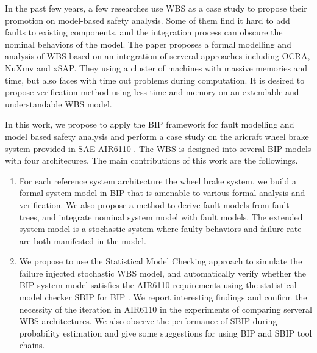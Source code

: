 

In the past few years, a few researches use WBS as a case study to propose their promotion on model-based safety analysis.
 Some of them find it hard to add faults to existing components, and the integration process can obscure the nominal behaviors of the model. 
 The paper\cite{cav15} proposes a formal modelling and analysis of WBS based on an integration of serveral approaches including OCRA, NuXmv and xSAP.
 They using a cluster of machines with massive memories and time, but also faces with time out problems during computation. 
 It is desired to propose verification method using less time and memory on an extendable and understandable WBS model.


In this work, we propose to apply the BIP framework for fault modelling and model based safety analysis 
 and perform a case study on the aricraft wheel brake system provided in SAE AIR6110  \cite{air6110}.
 The WBS is designed into several BIP models with four architecures. 
 The main contributions of this work are the followings.

\begin{enumerate}
\item For each reference system architecture the wheel brake system,  we build a formal system model in BIP that is amenable to various formal analysis and verification.
 We also propose a method to derive fault models from fault trees, and integrate nominal system model with fault models. 
 The extended system model is a stochastic system where faulty behaviors and failure rate are both manifested in the model.

\item We propose to use the Statistical Model Checking\cite{vmcai04,cav04,cmu04} approach to simulate the failure injected stochastic WBS model,
 and automatically verify whether the BIP system model satisfies the AIR6110 requirements using the statistical model checker SBIP for BIP \cite{sbip18}.
 We report interesting findings and confirm the necessity of the iteration in AIR6110 in the experiments of comparing serveral WBS architectures. 
 We also observe the performance of SBIP during probability estimation and give some suggestions for using BIP and SBIP tool chains.
\end{enumerate}


